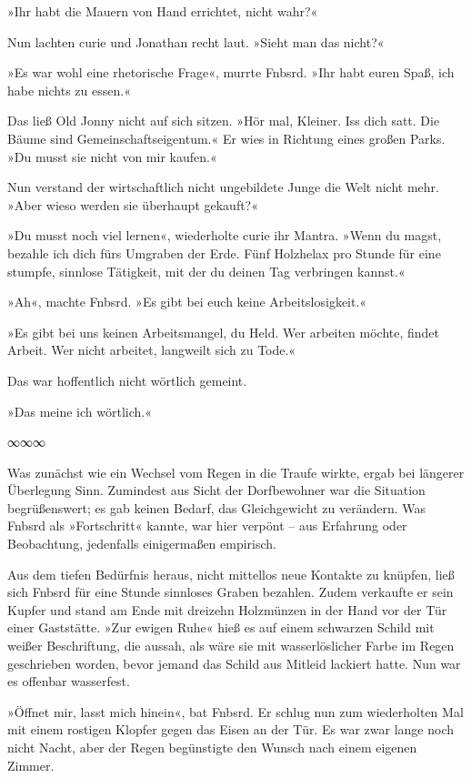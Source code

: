 »Ihr habt die Mauern von Hand errichtet, nicht wahr?«

Nun lachten curie und Jonathan recht laut. »Sieht man das nicht?«

»Es war wohl eine rhetorische Frage«, murrte Fnbsrd. »Ihr habt euren Spaß, ich habe nichts zu essen.«

Das ließ Old Jonny nicht auf sich sitzen. »Hör mal, Kleiner. Iss dich satt. Die Bäume sind Gemeinschaftseigentum.« Er wies in Richtung eines großen Parks. »Du musst sie nicht von mir kaufen.«

Nun verstand der wirtschaftlich nicht ungebildete Junge die Welt nicht mehr. »Aber wieso werden sie überhaupt gekauft?«

»Du musst noch viel lernen«, wiederholte curie ihr Mantra. »Wenn du magst, bezahle ich dich fürs Umgraben der Erde. Fünf Holzhelax pro Stunde für eine stumpfe, sinnlose Tätigkeit, mit der du deinen Tag verbringen kannst.«

»Ah«, machte Fnbsrd. »Es gibt bei euch keine Arbeitslosigkeit.«

»Es gibt bei uns keinen Arbeitsmangel, du Held. Wer arbeiten möchte, findet Arbeit. Wer nicht arbeitet, langweilt sich zu Tode.«

Das war hoffentlich nicht wörtlich gemeint.

»Das meine ich wörtlich.«

\begin{center}
∞∞∞
\end{center}

Was zunächst wie ein Wechsel vom Regen in die Traufe wirkte, ergab bei längerer Überlegung Sinn. Zumindest aus Sicht der Dorfbewohner war die Situation begrüßenswert; es gab keinen Bedarf, das Gleichgewicht zu verändern. Was Fnbsrd als »Fortschritt« kannte, war hier verpönt – aus Erfahrung oder Beobachtung, jedenfalls einigermaßen empirisch.

Aus dem tiefen Bedürfnis heraus, nicht mittellos neue Kontakte zu knüpfen, ließ sich Fnbsrd für eine Stunde sinnloses Graben bezahlen. Zudem verkaufte er sein Kupfer und stand am Ende mit dreizehn Holzmünzen in der Hand vor der Tür einer Gaststätte. »Zur ewigen Ruhe« hieß es auf einem schwarzen Schild mit weißer Beschriftung, die aussah, als wäre sie mit wasserlöslicher Farbe im Regen geschrieben worden, bevor jemand das Schild aus Mitleid lackiert hatte. Nun war es offenbar wasserfest.

»Öffnet mir, lasst mich hinein«, bat Fnbsrd. Er schlug nun zum wiederholten Mal mit einem rostigen Klopfer gegen das Eisen an der Tür. Es war zwar lange noch nicht Nacht, aber der Regen begünstigte den Wunsch nach einem eigenen Zimmer.

